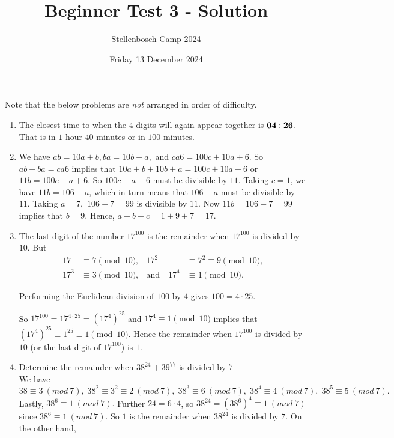 \documentclass[12pt]{article}
\title{Beginner Test 3 - Solution}
\author{Stellenbosch Camp 2024}
\date{Friday 13 December 2024}
\begin{document}
 \maketitle

Note that the below problems are \emph{not} arranged in order of difficulty.

\begin{enumerate}[topsep=2\bigskipamount,itemsep=\bigskipamount]

\item The closest time to when the 4 digits will again appear together is ${\bf 04:26}$. That is in $1$ hour $40$ minutes or in $100$ minutes.

\item We have $ab = 10a + b, ba = 10b+a,$ and $ca6=100c+10a+6$. So $ab+ba=ca6$ implies that $10a+b + 10b+a=100c+10a+6$ or $11b =100c-a+6.$ So $100c-a+6$ must be divisible by $11$. Taking $c=1$, we have $11b=106-a$, which in turn means that $106-a$ must be divisible by $11.$ Taking $a=7,$ $106-7=99$ is divisible by $11$. Now $11b=106-7=99$ implies that $b=9$. Hence, $a+b+c=1+9+7=17$.

\item The last digit of the number $17^{100}$ is the remainder when $17^{100}$ is divided by $10$.
But 
\begin{align*}
    17 &\equiv 7 \pmod{10}, & 17^2 &\equiv 7^2\equiv 9 \pmod{10}, \\
    17^3 &\equiv 3 \pmod{10}, & \text{and}\quad 17^4 & \equiv 1 \pmod{10}.
\end{align*}

Performing the Euclidean division of $100$ by $4$ gives  $100=4\cdot 25$.

So $ 17^{100} = 17^{4\cdot 25} = (17^{4})^{25}$ and  $17^4 \equiv 1 \pmod{10}$ implies that $(17^4)^{25} \equiv 1^{25} \equiv 1 \pmod{10}$.
Hence the remainder when $17^{100}$ is divided by $10$ (or the last digit of $17^{100}$) is $1$.

\item Determine the remainder when $38^{24}+39^{77}$ is divided by $7$\\
We have 
\[ 38 \equiv 3 \ (mod \ 7), \; 38^2 \equiv 3^2 \equiv 2\ (mod \ 7),\; 38^3\equiv 6\ (mod \ 7), \; 38^4\equiv 4\ (mod\ 7),\; 38^5\equiv 5\ (mod \ 7).\] 
Lastly, $38^6 \equiv 1\ (mod \ 7).$ Further $24 = 6\cdot 4$, so $38^{24} = (38^{6})^{4} \equiv 1\ (mod \ 7)$ since $38^6\equiv 1\ (mod\ 7)$.  So $1$ is the remainder when $38^{24}$ is divided by $7.$ On the other hand,


\end{enumerate}
\end{document}

